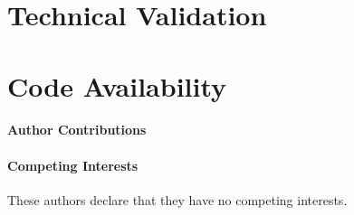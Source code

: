 \documentclass{article}
\newcommand{\fixme}[1]{{\color{red}{\bf FIXME: #1}\color{black}}}
\begin{document}
\section*{Technical Validation}

\fixme{False discovery rate curves}

\section*{Code Availability}



\paragraph{Author Contributions}

\paragraph{Competing Interests}
These authors declare that they have no competing interests.
  
\end{document}
